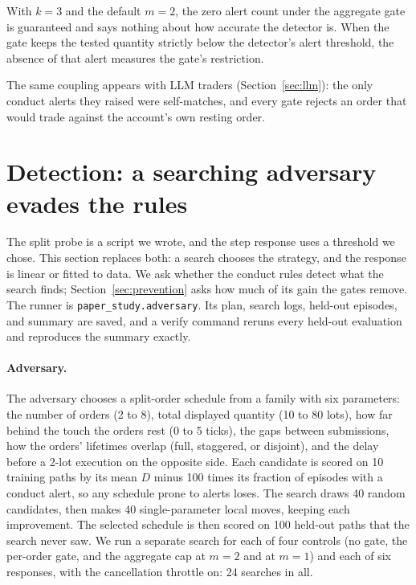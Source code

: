 \documentclass{article}
\begin{document}
With $k = 3$ and the default $m = 2$, the zero alert count under the aggregate gate is guaranteed and says nothing about how accurate the detector is. When the gate keeps the tested quantity strictly below the detector's alert threshold, the absence of that alert measures the gate's restriction.

The same coupling appears with LLM traders (Section~\ref{sec:llm}): the only conduct alerts they raised were self-matches, and every gate rejects an order that would trade against the account's own resting order.

\section{Detection: a searching adversary evades the rules}\label{sec:adversary}

The split probe is a script we wrote, and the step response uses a threshold we chose. This section replaces both: a search chooses the strategy, and the response is linear or fitted to data. We ask whether the conduct rules detect what the search finds; Section~\ref{sec:prevention} asks how much of its gain the gates remove. The runner is \texttt{paper\_study.adversary}. Its plan, search logs, held-out episodes, and summary are saved, and a verify command reruns every held-out evaluation and reproduces the summary exactly.

\paragraph{Adversary.} The adversary chooses a split-order schedule from a family with six parameters: the number of orders (2 to 8), total displayed quantity (10 to 80 lots), how far behind the touch the orders rest (0 to 5 ticks), the gaps between submissions, how the orders' lifetimes overlap (full, staggered, or disjoint), and the delay before a 2-lot execution on the opposite side. Each candidate is scored on 10 training paths by its mean $D$ minus 100 times its fraction of episodes with a conduct alert, so any schedule prone to alerts loses. The search draws 40 random candidates, then makes 40 single-parameter local moves, keeping each improvement. The selected schedule is then scored on 100 held-out paths that the search never saw. We run a separate search for each of four controls (no gate, the per-order gate, and the aggregate cap at $m = 2$ and at $m = 1$) and each of six responses, with the cancellation throttle on: 24 searches in all.
\end{document}
